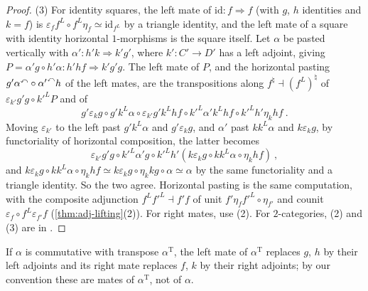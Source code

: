 \begin{proof}
(3) For identity squares, the left mate of
$\mathrm{id}\colon f \Rightarrow f$
(with $g$, $h$ identities and $k = f$) is
$\varepsilon_{f}f^{L} \circ f^{L}\eta_{f} \simeq \mathrm{id}_{f^{L}}$
by a triangle identity, and the left mate of a square with identity horizontal
$1$-morphisms is the square itself. Let $\alpha$ be pasted vertically with
$\alpha'\colon h'k \Rightarrow k'g'$,
where
$k'\colon C' \to D'$
has a left adjoint, giving
$P = \alpha'g \circ h'\alpha\colon h'hf \Rightarrow k'g'g$.
The left mate of $P$, and the horizontal pasting
$g'{\alpha}^{\curvearrowleft} \circ {\alpha'}^{\curvearrowleft}h$
of the left mates, are the transpositions along
$f^{\natural} \dashv (f^{L})^{\natural}$
of
$\varepsilon_{k'}g'g \circ k'^{L}P$
and of
\begin{equation*}
g'\varepsilon_{k}g \circ g'k^{L}\alpha \circ \varepsilon_{k'}g'k^{L}hf \circ
k'^{L}\alpha'k^{L}hf \circ k'^{L}h'\eta_{k}hf \ .
\end{equation*}
Moving $\varepsilon_{k'}$ to the left past $g'k^{L}\alpha$ and
$g'\varepsilon_{k}g$, and $\alpha'$ past $kk^{L}\alpha$ and $k\varepsilon_{k}g$,
by functoriality of horizontal composition, the latter becomes
\begin{equation*}
\varepsilon_{k'}g'g \circ k'^{L}\alpha'g \circ k'^{L}h'(k\varepsilon_{k}g \circ
kk^{L}\alpha \circ \eta_{k}hf) \ ,
\end{equation*}
and
$k\varepsilon_{k}g \circ kk^{L}\alpha \circ \eta_{k}hf \simeq k\varepsilon_{k}g
\circ \eta_{k}kg \circ \alpha \simeq \alpha$
by the same functoriality and a triangle identity. So the two agree.
Horizontal pasting is the same computation, with the composite adjunction
$f^{L}f'^{L} \dashv f'f$
of unit
$f'\eta_{f}f'^{L} \circ \eta_{f'}$
and counit
$\varepsilon_{f} \circ f^{L}\varepsilon_{f'}f$
(\cref{thm:adj-lifting}(2)). For right mates, use (2).
For $2$-categories, (2) and (3) are in \cite{kellystreet1974review}.
\end{proof}

\begin{rmk}
\label{rmk:mates-memo}
%
If $\alpha$ is commutative with transpose $\alpha^{\mathrm{T}}$,
the left mate of $\alpha^{\mathrm{T}}$ replaces $g$,
$h$ by their left adjoints and its right mate replaces $f$,
$k$ by their right adjoints; by our convention these are mates of
$\alpha^{\mathrm{T}}$, not of $\alpha$.
\end{rmk}

